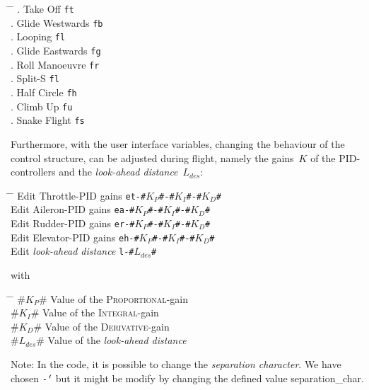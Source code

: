 \documentclass[11pt,a4paper]{scrartcl}		%
\begin{document}
\begin{tabbing}
	\hspace{2cm} \= \hspace{4cm} \= \hspace{3cm} \kill
	. Take Off \> \texttt{ft} \\	
	. Glide Westwards \> \texttt{fb} \\	
	. Looping\> \texttt{fl} \\	
	. Glide Eastwards \> \texttt{fg} \\
	. Roll Manoeuvre \> \texttt{fr} \\		
	. Split-S \> \texttt{fl} \\	
	. Half Circle \> \texttt{fh} \\	
	. Climb Up \> \texttt{fu} \\	
	. Snake Flight \> \texttt{fs} \\		
\end{tabbing}



\medskip

Furthermore, with the user interface variables, changing the behaviour of the control structure, can be adjusted during flight, namely the gains~$K$ of the PID-controllers and the \textsl{look-ahead distance}~$L_{des}$:

\begin{tabbing}
	\hspace{2cm} \= \hspace{6cm} \= \hspace{7cm} \kill
	\> Edit Throttle-PID gains \> \texttt{et-\#$K_P$\#-\#$K_I$\#-\#$K_D$\#} \\
	\> Edit Aileron-PID gains \> \texttt{ea-\#$K_P$\#-\#$K_I$\#-\#$K_D$\#} \\
	\> Edit Rudder-PID gains \> \texttt{er-\#$K_P$\#-\#$K_I$\#-\#$K_D$\#} \\
	\> Edit Elevator-PID gains \> \texttt{eh-\#$K_P$\#-\#$K_I$\#-\#$K_D$\#} \\
	\> Edit \textsl{look-ahead distance} \> \texttt{l-\#$L_{des}$\#} 
\end{tabbing} 
with 
\begin{tabbing}
	\hspace{2cm} \= \hspace{3cm} \= \hspace{7cm} \kill
	\> \#$K_P$\# \> Value of the \textsc{Proportional}-gain \\
	\> \#$K_I$\# \> Value of the \textsc{Integral}-gain \\
	\> \#$K_D$\# \> Value of the \textsc{Derivative}-gain \\
	\> \#$L_{des}$\# \> Value of the \textsl{look-ahead distance} \\
\end{tabbing}
\noindent
Note: In the code, it is possible to change the \textsl{separation character}. We have chosen \texttt{\'-\'} but it might be modify by changing the defined value \textsf{separation\_char}.
\end{document}
